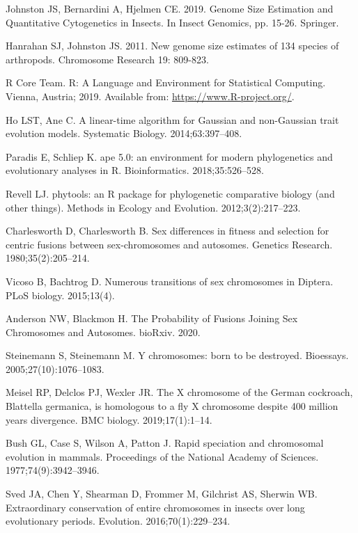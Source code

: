 \documentclass[]{rsos}%
\begin{document}
\begin{thebibliography}{99}
Johnston JS, Bernardini A, Hjelmen CE. 2019. 
Genome Size Estimation and Quantitative Cytogenetics in Insects. In Insect Genomics, pp. 15-26. Springer.

Hanrahan SJ, Johnston JS. 2011. 
New genome size estimates of 134 species of arthropods. Chromosome Research 19: 809-823.

{R Core Team}. R: A Language and Environment for Statistical Computing.
 Vienna, Austria; 2019.
 Available from: \url{https://www.R-project.org/}.
 
Ho LST, Ane C.
 A linear-time algorithm for Gaussian and non-Gaussian trait evolution
  models.
 Systematic Biology. 2014;63:397--408.

Paradis E, Schliep K.
 ape 5.0: an environment for modern phylogenetics and evolutionary
  analyses in {R}.
 Bioinformatics. 2018;35:526--528.

Revell LJ.
 phytools: an R package for phylogenetic comparative biology (and
  other things).
 Methods in Ecology and Evolution. 2012;3(2):217--223.

Charlesworth D, Charlesworth B.
 Sex differences in fitness and selection for centric fusions between
  sex-chromosomes and autosomes.
 Genetics Research. 1980;35(2):205--214.
 
Vicoso B, Bachtrog D.
Numerous transitions of sex chromosomes in Diptera.
PLoS biology. 2015;13(4).
 
Anderson NW, Blackmon H.
\newblock The Probability of Fusions Joining Sex Chromosomes and Autosomes.
\newblock bioRxiv. 2020.
 
Steinemann S, Steinemann M.
 Y chromosomes: born to be destroyed.
 Bioessays. 2005;27(10):1076--1083.

Meisel RP, Delclos PJ, Wexler JR.
 The X chromosome of the German cockroach, Blattella germanica, is
  homologous to a fly X chromosome despite 400 million years divergence.
 BMC biology. 2019;17(1):1--14.

Bush GL, Case S, Wilson A, Patton J.
 Rapid speciation and chromosomal evolution in mammals.
 Proceedings of the National Academy of Sciences.
  1977;74(9):3942--3946.

Sved JA, Chen Y, Shearman D, Frommer M, Gilchrist AS, Sherwin WB.
 Extraordinary conservation of entire chromosomes in insects over long
  evolutionary periods.
 Evolution. 2016;70(1):229--234.
 

\end{thebibliography}
\end{document}
